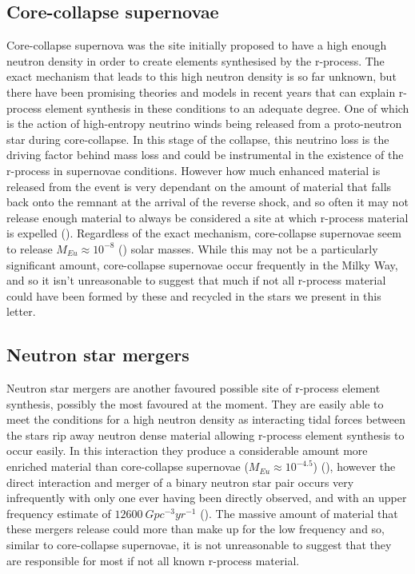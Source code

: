 \documentclass[a4paper,fleqn,usenatbib]{mnras}
\begin{document}
	\subsection{Core-collapse supernovae}
	Core-collapse supernova was the site initially proposed to have a high enough neutron density in order to create elements synthesised by the r-process. The exact mechanism that leads to this high neutron density is so far unknown, but there have been promising theories and models in recent years that can explain r-process element synthesis in these conditions to an adequate degree. One of which is the action of high-entropy neutrino winds being released from a proto-neutron star during core-collapse. In this stage of the collapse, this neutrino loss is the driving factor behind mass loss and could be instrumental in the existence of the r-process in supernovae conditions. However how much enhanced material is released from the event is very dependant on the amount of material that falls back onto the remnant at the arrival of the reverse shock, and so often it may not release enough material to always be considered a site at which r-process material is expelled (\cite{Woosley1992}). Regardless of the exact mechanism, core-collapse supernovae seem to release $M_{Eu}\approx10^{-8}$ (\cite{Argast2004}) solar masses. While this may not be a particularly significant amount, core-collapse supernovae occur frequently in the Milky Way, and so it isn't unreasonable to suggest that much if not all r-process material could have been formed by these and recycled in the stars we present in this letter.
	
	\subsection{Neutron star mergers}
	\label{NSmerg}
	Neutron star mergers are another favoured possible site of r-process element synthesis, possibly the most favoured at the moment. They are easily able to meet the conditions for a high neutron density as interacting tidal forces between the stars rip away neutron dense material allowing r-process element synthesis to occur easily. In this interaction they produce a considerable amount more enriched material than core-collapse supernovae ($M_{Eu}\approx10^{-4.5}$) (\cite{Goriely2011}), however the direct interaction and merger of a binary neutron star pair occurs very infrequently with only one ever having been directly observed, and with an upper frequency estimate of $12600\ Gpc^{-3}yr^{-1}$ (\cite{LIGO2016}). The massive amount of material that these mergers release could more than make up for the low frequency and so, similar to core-collapse supernovae, it is not unreasonable to suggest that they are responsible for most if not all known r-process material. 
\end{document}
